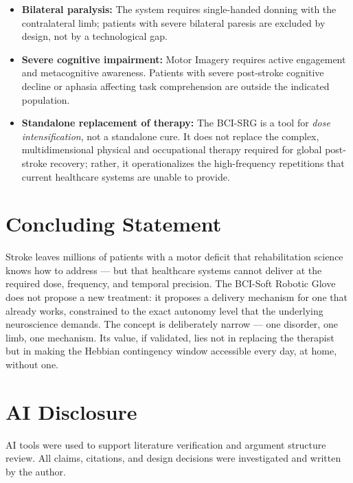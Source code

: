 \documentclass[11pt,a4paper]{article}
\begin{document}
\begin{itemize}
    \item \textbf{Bilateral paralysis:} The system requires 
    single-handed donning with the contralateral limb; patients 
    with severe bilateral paresis are excluded by design, not by 
    a technological gap.
    \item \textbf{Severe cognitive impairment:} Motor Imagery 
    requires active engagement and metacognitive awareness. 
    Patients with severe post-stroke cognitive decline or aphasia 
    affecting task comprehension are outside the indicated 
    population.
    \item \textbf{Standalone replacement of therapy:} The BCI-SRG is a tool for \textit{dose intensification}, not a standalone cure. It does not replace the complex, multidimensional physical and occupational therapy required for global post-stroke recovery; rather, it operationalizes the high-frequency repetitions that current healthcare systems are unable to provide.
\end{itemize}

\section{Concluding Statement}

Stroke leaves millions of patients with a motor deficit that 
rehabilitation science knows how to address — but that healthcare 
systems cannot deliver at the required dose, frequency, and 
temporal precision. The BCI-Soft Robotic Glove does not propose a new treatment: 
it proposes a delivery mechanism for one that already works, 
constrained to the exact autonomy level that the underlying 
neuroscience demands. The concept is deliberately narrow — one 
disorder, one limb, one mechanism. Its value, if validated, lies 
not in replacing the therapist but in making the Hebbian 
contingency window accessible every day, at home, without one.

\section*{AI Disclosure}
AI tools were used to support literature 
verification and argument structure review. All claims, citations, and 
design decisions were investigated and written by the author.


\end{document}
